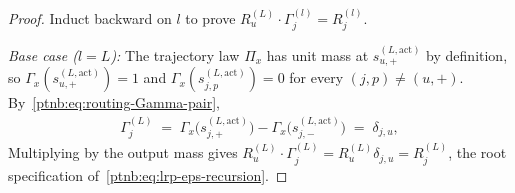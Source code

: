 \begin{proof}
Induct backward on $l$ to prove $R_u^{(L)}\cdot\Gamma^{(l)}_j=R^{(l)}_j$.

\emph{Base case ($l = L$):} The trajectory law $\Pi_x$ has unit mass at
$s_{u,+}^{(L,\mathrm{act})}$ by definition, so $\Gamma_x(s_{u,+}^{(L,\mathrm{act})}) = 1$ and
$\Gamma_x(s_{j,p}^{(L,\mathrm{act})}) = 0$ for every $(j,p) \neq (u,+)$.
By~\eqref{ptnb:eq:routing-Gamma-pair},
\begin{align}
    \Gamma^{(L)}_j \;=\; \Gamma_x\!\bigl(s_{j,+}^{(L,\mathrm{act})}\bigr) -
    \Gamma_x\!\bigl(s_{j,-}^{(L,\mathrm{act})}\bigr) \;=\; \delta_{j,u},
\end{align}
Multiplying by the output mass gives $R_u^{(L)}\cdot\Gamma^{(L)}_j=R_u^{(L)}\delta_{j,u}=R^{(L)}_j$,
the root specification of~\eqref{ptnb:eq:lrp-eps-recursion}.


\end{proof}
